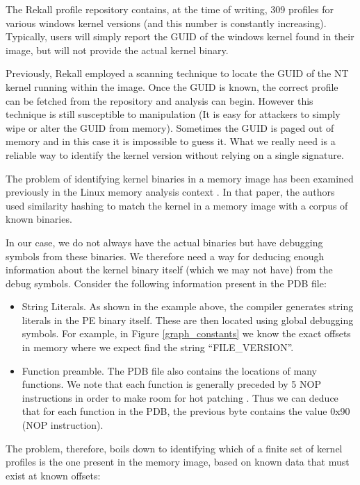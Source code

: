 The Rekall profile repository contains, at the time of writing, 309 profiles for
various windows kernel versions (and this number is constantly
increasing). Typically, users will simply report the GUID of the windows kernel
found in their image, but will not provide the actual kernel binary.

Previously, Rekall employed a scanning technique to locate the GUID of the NT
kernel running within the image. Once the GUID is known, the correct profile can
be fetched from the repository and analysis can begin. However this technique is
still susceptible to manipulation (It is easy for attackers to simply wipe or
alter the GUID from memory). Sometimes the GUID is paged out of memory and in
this case it is impossible to guess it. What we really need is a reliable way to
identify the kernel version without relying on a single signature.

The problem of identifying kernel binaries in a memory image has been examined
previously in the Linux memory analysis context \citep{roussev2014image}. In
that paper, the authors used similarity hashing to match the kernel in a memory
image with a corpus of known binaries.

In our case, we do not always have the actual binaries but have debugging
symbols from these binaries. We therefore need a way for deducing enough
information about the kernel binary itself (which we may not have) from the
debug symbols. Consider the following information present in the PDB file:

\begin{itemize}
\item String Literals. As shown in the example above, the compiler generates
  string literals in the PE binary itself. These are then located using global
  debugging symbols. For example, in Figure \ref{graph_constants} we know the
  exact offsets in memory where we expect find the string ``FILE\_VERSION''.

\item Function preamble. The PDB file also contains the locations of many
  functions. We note that each function is generally preceded by 5 NOP
  instructions in order to make room for hot patching \citep{hot_patching}. Thus
  we can deduce that for each function in the PDB, the previous byte contains
  the value 0x90 (NOP instruction).
\end{itemize}

The problem, therefore, boils down to identifying which of a finite set of
kernel profiles is the one present in the memory image, based on known data that
must exist at known offsets:

